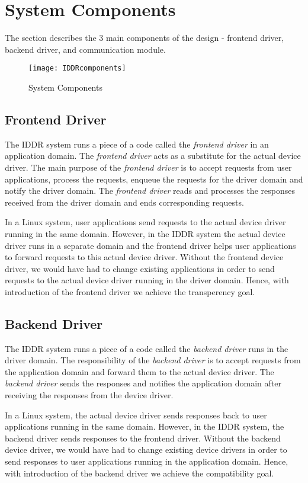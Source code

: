 \section{System Components}\label{components}
The section describes the 3 main components of the design - frontend driver, backend driver, and communication module.
\begin{figure}[!ht]
\centering
\texttt{[image: IDDRcomponents]}
\caption{System Components}
\label{fig:Design Evo1}
\end{figure}

\subsection{Frontend Driver}
\label{subsec:frontend}
The IDDR system runs a piece of a code called the \textit{frontend driver} in an application domain. The \textit{frontend driver} acts as a substitute for the actual device driver. The main purpose of the \textit{frontend driver} is to accept requests from user applications, process the requests, enqueue the requests for the driver domain and notify the driver domain. The \textit{frontend driver} reads and processes the responses received from the driver domain and ends corresponding requests.

In a Linux system, user applications send requests to the actual device driver running in the same domain. However, in the IDDR system the actual device driver runs in a separate domain and the frontend driver helps user applications to forward requests to this actual device driver. Without the frontend device driver, we would have had to change existing applications in order to send requests to the actual device driver running in the driver domain. Hence, with introduction of the frontend driver we achieve the transperency goal.

\subsection{Backend Driver}
\label{subsec:backend}
The IDDR system runs a piece of a code called the \textit{backend driver} runs in the driver domain. The responsibility of the \textit{backend driver} is to accept requests from the application domain and forward them to the actual device driver. The \textit{backend driver} sends the responses and notifies the application domain after receiving the responses from the device driver.

In a Linux system, the actual device driver sends responses back to user applications running in the same domain. However, in the IDDR system, the backend driver sends responses to the frontend driver. Without the backend device driver, we would have had to change existing device drivers in order to send responses to user applications running in the application domain. Hence, with introduction of the backend driver we achieve the compatibility goal.

